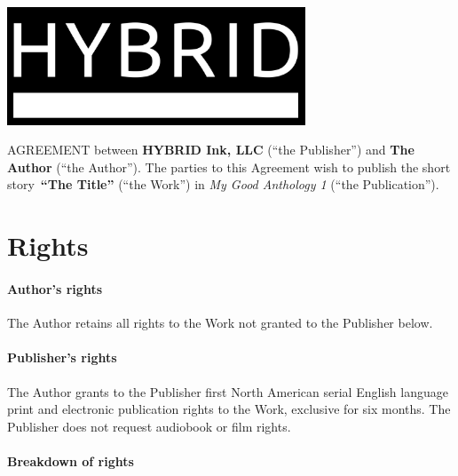 \documentclass[12pt,letterpaper,oneside]{article}
\def\WorkTitle{The Title}
\def\WorkAuthor{The Author}
\def\WorkType{short story}
\def\Publication{My Good Anthology}
\def\Issue{ 1} %
\begin{document}
\begin{center}
    \noindent\includegraphics[width=3.5in]{logo}
\end{center}

\vspace{0.5in}

\noindent AGREEMENT between \textbf{HYBRID Ink, LLC} (``the Publisher'') and \textbf{\WorkAuthor} (``the Author''). The parties to this Agreement wish to publish the \WorkType\ \textbf{``\WorkTitle''} (``the Work'') in \textit{\Publication\Issue} (``the Publication'').

\section{Rights}

\paragraph{Author's rights}

The Author retains all rights to the Work not granted to the Publisher below.

\paragraph{Publisher's rights}

The Author grants to the Publisher first North American serial English language print and electronic publication rights to the Work, exclusive for six months. The Publisher does not request audiobook or film rights.

\paragraph{Breakdown of rights}
\end{document}
